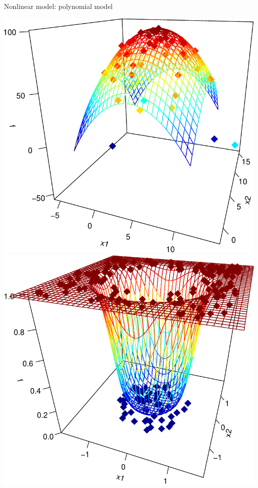 \documentclass[ignorenonframetext,aspectratio=169]{beamer}
\begin{document}
\begin{frame}{Nonlinear model: polynomial model}
\protect\hypertarget{nonlinear-model-polynomial-model}{}

\begin{center}\includegraphics[height=0.4\textheight]{lecture9_files/figure-beamer/figures-side-1} \includegraphics[height=0.4\textheight]{lecture9_files/figure-beamer/figures-side-2} \end{center}


\end{frame}
\end{document}
